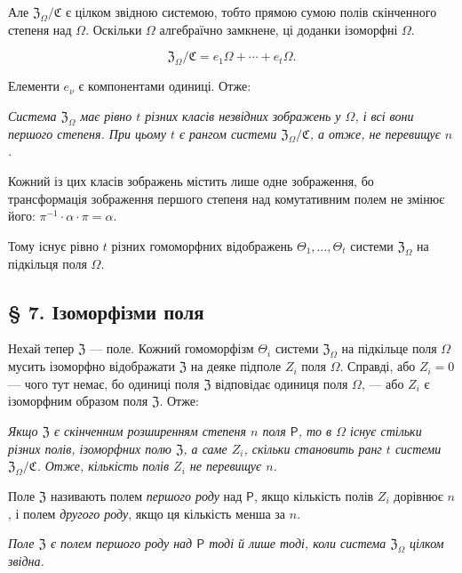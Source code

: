 \documentclass[11pt]{article}
\begin{document}
Але \(\mathfrak Z_\Omega/\mathfrak C\) є цілком звідною системою, тобто прямою сумою полів скінченного степеня над \(\Omega\). Оскільки \(\Omega\) алгебраїчно замкнене, ці доданки ізоморфні \(\Omega\).

\[
\mathfrak Z_\Omega/\mathfrak C=e_1\Omega+\cdots+e_t\Omega.
\]

Елементи \(e_\nu\) є компонентами одиниці. Отже:

\emph{Система \(\mathfrak Z_\Omega\) має рівно \(t\) різних класів незвідних зображень у \(\Omega\), і всі вони першого степеня. При цьому \(t\) є рангом системи \(\mathfrak Z_\Omega/\mathfrak C\), а отже, не перевищує \(n\).}

Кожний із цих класів зображень містить лише одне зображення, бо трансформація зображення першого степеня над комутативним полем не змінює його: \(\pi^{-1}\cdot\alpha\cdot\pi=\alpha\).

Тому існує рівно \(t\) різних гомоморфних відображень \(\Theta_1,\ldots,\Theta_t\) системи \(\mathfrak Z_\Omega\) на підкільця поля \(\Omega\).

\subsection*{§ 7. Ізоморфізми поля}\label{die-isomorphismen-eines-koerpers}

Нехай тепер \(\mathfrak Z\) --- поле. Кожний гомоморфізм \(\Theta_i\) системи \(\mathfrak Z_\Omega\) на підкільце поля \(\Omega\) мусить ізоморфно відображати \(\mathfrak Z\) на деяке підполе \(Z_i\) поля \(\Omega\). Справді, або \(Z_i=0\) --- чого тут немає, бо одиниці поля \(\mathfrak Z\) відповідає одиниця поля \(\Omega\), --- або \(Z_i\) є ізоморфним образом поля \(\mathfrak Z\). Отже:

\emph{Якщо \(\mathfrak Z\) є скінченним розширенням степеня \(n\) поля \(\mathsf P\), то в \(\Omega\) існує стільки різних полів, ізоморфних полю \(\mathfrak Z\), а саме \(Z_i\), скільки становить ранг \(t\) системи \(\mathfrak Z_\Omega/\mathfrak C\). Отже, кількість полів \(Z_i\) не перевищує \(n\).}

Поле \(\mathfrak Z\) називають полем \emph{першого роду} над \(\mathsf P\), якщо кількість полів \(Z_i\) дорівнює \(n\), і полем \emph{другого роду}, якщо ця кількість менша за \(n\).

\emph{Поле \(\mathfrak Z\) є полем першого роду над \(\mathsf P\) тоді й лише тоді, коли система \(\mathfrak Z_\Omega\) цілком звідна.}
\end{document}
